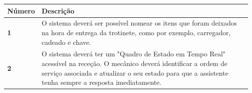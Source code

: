 \documentclass[11pt,a4paper]{article}
\begin{document}
		\begin{tabularx}{\textwidth}{@{}|l|X|@{}}
			\hline
			\rowcolor{gray!10} \textbf{Número} & \textbf{Descrição} \\ \hline
			\textbf{1} & O sistema deverá ser possível nomear os itens que foram deixados na hora de entrega da trotinete, como por exemplo, carregador, cadeado e chave.  \\ \hline
			\textbf{2} & O sistema deverá ter um "Quadro de Estado em Tempo Real" \space acessível na receção. O mecânico deverá identificar a ordem de serviço associada e atualizar o seu estado para que a assistente tenha sempre a resposta imediatamente. \\ \hline
		\end{tabularx}
	
\end{document}
